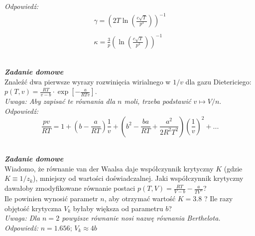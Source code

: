 \documentclass[11pt,a4paper]{article}
\newcounter{zadanie}\newcommand{\zadanie}[1][]{\addtocounter{zadanie}{1} ~\\  {\bf \emph{Zadanie \arabic{zadanie} #1 }} \\}
\newcounter{zaddom}\newcommand{\zaddom}[1][]{\addtocounter{zaddom}{1} ~\\  {\bf \emph{Zadanie domowe \arabic{zaddom} #1 }} \\}
\begin{document}
{\it Odpowiedź:}
\[
  \begin{array}{c}
    \gamma = \left(2T \ln\left( \frac{c \sqrt{T}}{p^3} \right) \right)^{-1}\\
    \\
    \kappa = \frac{3}{p} \left( \ln\left( \frac{c \sqrt{T}}{p^3} \right) \right)^{-1}
  \end{array}
\]    

\zaddom
Znaleźć dwa pierwsze wyrazy rozwinięcia wirialnego w $1/v$ dla gazu Dietericiego: 
$\displaystyle p(T,v) = \frac{R T}{v-b}\cdot\exp\left[-\frac{a}{R T v}\right]$.\\

{\em Uwaga: Aby zapisać te równania dla $n$ moli, trzeba podstawić $v\mapsto V/n$}.\\

{\it Odpowiedź:}
\[
  \frac{pv}{RT} = 1 + \left(b - \frac{a}{RT} \right) \frac{1}{v} + \left( b^2 - \frac{b a}{R T} + \frac{a^2}{2 R^2 T^2} \right) \left( \frac{1}{v} \right)^2 + ...
\]

\zaddom
Wiadomo, że równanie van der Waalsa daje współczynnik krytyczny $K$
(gdzie $K\equiv 1/z_k$), mniejszy od wartości doświadczalnej.
Jaki współczynnik krytyczny dawałoby zmodyfikowane równanie
postaci
\linebreak
\mbox{$\displaystyle p(T,V) = \frac{R T}{V-b} - \frac{a}{T V^n}$}? \\
Ile powinien wynosić parametr $n$, aby otrzymać  wartość
$K = 3.8$ ?
Ile razy objętość krytyczna $V_k$
byłaby większa od parametru $b$? \\

{\em Uwaga: Dla $n=2$ powyższe równanie nosi nazwę równania Berthelota.}\\

{\it Odpowiedź:} $n=1.656$; $V_k \approx 4b$


\end{document}
